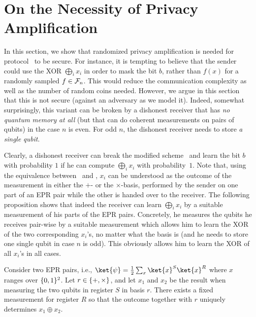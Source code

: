 \section{On the Necessity of Privacy Amplification}
In this section, we show that randomized privacy amplification is
needed for protocol \qot\ to be secure.
For instance, it is tempting to believe that the sender could use the
XOR $\bigoplus_i x_i$ in order to mask the bit $b$, rather than $f(x)$
for a randomly sampled $f \in \mathcal{F}_{n}$. This would reduce the
communication complexity as well as the number of random coins needed.
However, we argue in this section that this is not secure (against an
adversary as we model it). Indeed, somewhat surprisingly, this variant
can be broken by a dishonest receiver that has {\em no quantum memory
 at all} (but that can do coherent measurements on pairs of qubits) in
the case $n$ is even. For odd $n$, the dishonest receiver needs to
store \emph{a single qubit}.

Clearly, a dishonest receiver can break the modified scheme \qot\ and
learn the bit $b$ with probability $1$ if he can compute $\bigoplus_i
x_i$ with probability~$1$. Note that, using the equivalence between
\qot\ and \eprqot, $x_i$ can be understood as the outcome of the
 
measurement in either the $+$- or the $\times$-basis, performed by the
sender on one part of an EPR pair while the other is handed over
to the receiver.  The following proposition shows that indeed the
receiver can learn $\bigoplus_i x_i$ by a suitable measurement of his
parts of the EPR pairs. Concretely, he measures the qubits he receives
pair-wise by a suitable measurement which allows him to learn the XOR
of the two corresponding $x_i$'s, no matter what the basis is (and he
needs to store one single qubit in case $n$ is odd). This obviously
allows him to learn the XOR of all $x_i$'s in all cases.

\begin{proposition}
  Consider two EPR pairs, i.e., $\ket{\psi} = \frac{1}{2} \sum_{x}
  \ket{x}^S\ket{x}^R$ where $x$ ranges over $\{0,1\}^2$.  Let $r \in
  \{+,\times\}$, and let $x_1$ and $x_2$ be the result when
  measuring the two qubits in register $S$ in basis $r$.  There exists
  a fixed measurement for register $R$ so that the outcome together
  with $r$ uniquely determines $x_1 \oplus x_2$.
\end{proposition}

